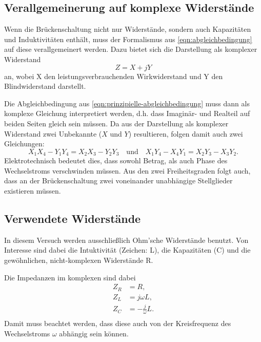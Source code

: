 \subsection{Verallgemeinerung auf komplexe Widerstände}
\label{sec:komplexe-widerstände}
Wenn die Brückenschaltung nicht nur Widerstände, sondern auch Kapazitäten und Induktivitäten
enthält, muss der Formalismus aus \autoref{eqn:abgleichbedingung} auf diese verallgemeinert
werden. Dazu bietet sich die Darstellung als komplexer Widerstand
\begin{equation}
	Z = X + jY
	\label{eqn:komplexer-widerstand}
\end{equation}
an, wobei X den leistungsverbrauchenden Wirkwiderstand und Y den Blindwiderstand darstellt.

Die Abgleichbedingung aus \autoref{eqn:prinzipielle-abgleichbedingung} muss dann als komplexe
Gleichung interpretiert werden, d.h. dass Imaginär- und Realteil auf beiden Seiten gleich sein
müssen. Da aus der Darstellung als komplexer Widerstand zwei Unbekannte ($X$ und $Y$) resultieren,
folgen damit auch zwei Gleichungen:
\begin{equation}
	X_1X_4 - Y_1Y_4 = X_2X_3 - Y_2Y_3 
	\quad \text{und} \quad
	X_1Y_4 - X_4Y_1 = X_2Y_3 - X_3Y_2.
	\label{eqn:komplexe-abgleichbedingung}
\end{equation}
Elektrotechnisch bedeutet dies, dass sowohl Betrag, als auch Phase des Wechselstroms verschwinden
müssen. Aus den zwei Freiheitsgraden folgt auch, dass an der Brückenschaltung zwei voneinander
unabhängige Stellglieder existieren müssen.

\subsection{Verwendete Widerstände}
\label{seq:widerstände}
In diesem Versuch werden ausschließlich Ohm'sche Widerstände benutzt. Von Interesse sind dabei
die Intuktivität (Zeichen: L), die Kapazitäten (C) und die gewöhnlichen, nicht-komplexen 
Widerstände R.

Die Impedanzen im komplexen sind dabei
\begin{align}
	Z_R &= R, \\
	Z_L &= j\omega L, \\
	Z_C &= -\frac{j}{\omega} L. \\
	\label{eqn:impedanzen}
\end{align}
Damit muss beachtet werden, dass diese auch von der Kreisfrequenz des Wechselstroms $\omega$ 
abhängig sein können. 

